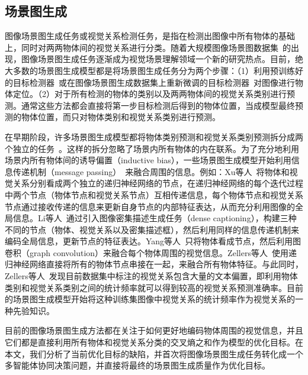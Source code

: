 \subsection{场景图生成}
图像场景图生成任务或视觉关系检测任务，是指在检测出图像中所有物体的基础上，同时对两两物体间的视觉关系进行分类。随着大规模图像场景图数据集~\cite{krishna2017visual}的出现，图像场景图生成任务逐渐成为视觉场景理解领域一个新的研究热点。目前，绝大多数的场景图生成模型都是将场景图生成任务分为两个步骤：（1）利用预训练好的目标检测器~\cite{lu2016visual,zhuang2017towards,zhang2017visual,dai2017detecting,yang2018shuffle,yu2017visual}或在图像场景图生成数据集上重新微调的目标检测器~\cite{li2017vip,xu2017scene,yin2018zoom,zellers2018neural,zhang2017relationship,zhang2019large}对图像进行物体定位。（2）对于所有检测的物体的类别以及两两物体间的视觉关系类别进行预测。通常这些方法都会直接将第一步目标检测后得到的物体位置，当成模型最终预测的物体位置，而只对物体类别和视觉关系类别进行预测。


在早期阶段，许多场景图生成模型都将物体类别预测和视觉关系类别预测拆分成两个独立的任务~\cite{lu2016visual,zhang2017visual,zhuang2017towards,zhu2018deep,zhang2017relationship}。这样的拆分忽略了场景内所有物体的内在联系。为了充分地利用场景内所有物体间的诱导偏置（inductive bias），一些场景图生成模型开始利用信息传递机制（message passing）~\cite{xu2017scene,dai2017detecting,li2017scene,li2018factorizable,yin2018zoom,jae2018tensorize,yang2018graph,tang2019learning,gu2019scene,qi2019attentive,wang2019exploring}来融合周围的信息。例如：Xu等人~\cite{xu2017scene}将物体和视觉关系分别看成两个独立的递归神经网络的节点，在递归神经网络的每个迭代过程中两个节点（物体节点和视觉关系节点）互相传递信息，每个物体节点和视觉关系节点通过接收传递的信息来更新自身节点的内部特征表达，从而充分利用图像的全局信息。Li等人~\cite{li2017scene}通过引入图像密集描述生成任务（dense captioning），构建三种不同的节点（物体、视觉关系以及密集描述框），然后利用同样的信息传递机制来编码全局信息，更新节点的特征表达。Yang等人~\cite{yang2018graph}只将物体看成节点，然后利用图卷积（graph convolution）来融合每个物体周围的视觉信息。Zellers等人~\cite{zellers2018neural}使用递归神经网络直接将所有的物体节点串接在一起，来融合所有物体特征。与此同时，Zellers等人~\cite{zellers2018neural}发现目前数据集中标注的视觉关系包含大量的文本偏置，即利用物体类别和视觉关系类别之间的统计频率就可以得到较高的视觉关系预测准确率。目前的场景图生成模型开始将这种训练集图像中视觉关系的统计频率作为视觉关系的一种先验知识。

目前的图像场景图生成方法都在关注于如何更好地编码物体周围的视觉信息，并且它们都是直接利用所有物体和视觉关系分类的交叉熵之和作为模型的优化目标。在本文，我们分析了当前优化目标的缺陷，并首次将图像场景图生成任务转化成一个多智能体协同决策问题，并直接将最终的场景图生成质量作为优化目标。

